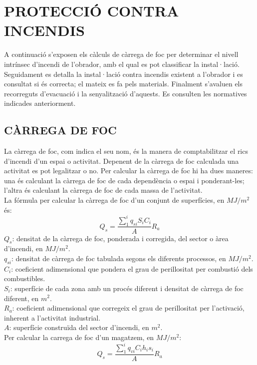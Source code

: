 \chapter{\uppercase{Protecció contra incendis}}
A continuació s'exposen els càlculs de càrrega de foc per determinar el nivell intrínsec d'incendi de l'obrador, amb el qual es pot classificar la instal·lació. Seguidament es detalla la instal·lació contra incendis existent a l'obrador i es consultat si és correcta; el mateix es fa pels materials. Finalment s'avaluen els recorreguts d'evacuació i la senyalització d'aquests. Es consulten les normatives indicades anteriorment.

\section{\uppercase{Càrrega de foc}}
La càrrega de foc, com indica el seu nom, és la manera de comptabilitzar el rics d'incendi d'un espai o activitat. Depenent de la càrrega de foc calculada una activitat es pot legalitzar o no. Per calcular la càrrega de foc hi ha dues maneres: una és calculant la càrrega de foc de cada dependència o espai i ponderant-les; l'altra és calculant la càrrega de foc de cada massa de l'activitat.\\
\newline La fórmula per calcular la càrrega de foc d'un conjunt de superfícies, en $MJ/m^2$ és:
\begin{equation}
Q_s = \frac{\sum_{1}^{i}q_{si}S_iC_i}{A}R_a 
\end{equation}
$Q_s$: densitat de la càrrega de foc, ponderada i corregida, del sector o àrea d'incendi, en $MJ/m^2$.\\
$q_{si}$: densitat de càrrega de foc tabulada segons els diferents processos, en $MJ/m^2$.\\
$C_i$: coeficient adimensional que pondera el grau de perillositat per combustió dels combustibles.\\ 
$S_i$: superfície de cada zona amb un procés diferent i densitat de càrrega de foc diferent, en $m^2$.\\
$R_a$: coeficient adimensional que corregeix el grau de perillositat per l'activació, inherent a l'activitat industrial.\\
$A$: superfície construïda del sector d'incendi, en $m^2$.\\
\newline Per calcular la carrega de foc d'un magatzem, en $MJ/m^2$:
\begin{equation}
Q_s = \frac{\sum_{1}^{i}q_{vi}C_ih_is_i}{A}R_a 
\end{equation}
